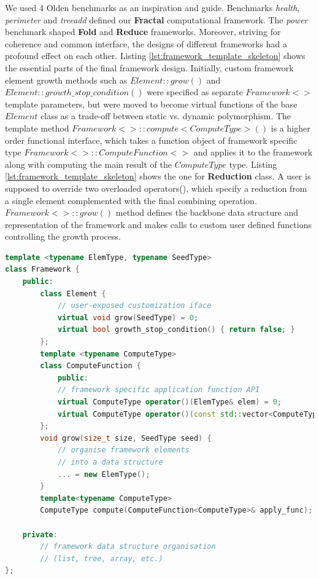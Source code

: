 \quad We used 4 Olden benchmarks as an inspiration and guide. Benchmarks \textit{health}, \textit{perimeter} and \textit{treeadd} defined our \textbf{Fractal} computational framework. The \textit{power} benchmark shaped \textbf{Fold} and \textbf{Reduce} frameworks. Moreover, striving for coherence and common interface, the designs of different frameworks had a profound effect on each other.\newline\null
\quad Listing \ref{lst:framework_template_skeleton} shows the essential parts of the final framework design. Initially, custom framework element growth methods such as $Element::grow()$ and $Element::growth\_stop\_condition()$ were specified as separate $Framework<>$ template parameters, but were moved to become virtual functions of the base $Element$ class as a trade-off between static vs. dynamic polymorphism. The template method $Framework<>::compute<ComputeType>()$ is a higher order functional interface, which takes a function object of framework specific type $Framework<>::ComputeFunction<>$ and applies it to the framework along with computing the main result of the $ComputeType$ type. Listing \ref{lst:framework_template_skeleton} shows the one for \textbf{Reduction} class. A user is supposed to override two overloaded operators(), which specify a reduction from a single element complemented with the final combining operation. $Framework<>::grow()$ method defines the backbone data structure and representation of the framework and makes calls to custom user defined functions controlling the growth process.

\begin{minipage}[t]{\linewidth}
\begin{lstlisting}[caption={Computational framework class template skeleton},label={lst:framework_template_skeleton},language=C++]
template <typename ElemType, typename SeedType>
class Framework {
    public:
        class Element {
            // user-exposed customization iface
            virtual void grow(SeedType) = 0;
            virtual bool growth_stop_condition() { return false; }
        };
        template <typename ComputeType>
        class ComputeFunction {
            public:
            // framework specific application function API
            virtual ComputeType operator()(ElemType& elem) = 0;
            virtual ComputeType operator()(const std::vector<ComputeType>&) = 0;
        };
        void grow(size_t size, SeedType seed) {
            // organise framework elements 
            // into a data structure
            ... = new ElemType(); 
        }
        template<typename ComputeType>
        ComputeType compute(ComputeFunction<ComputeType>& apply_func);
    
    private:
        // framework data structure organisation
        // (list, tree, array, etc.)
};

\end{lstlisting}
\end{minipage}

